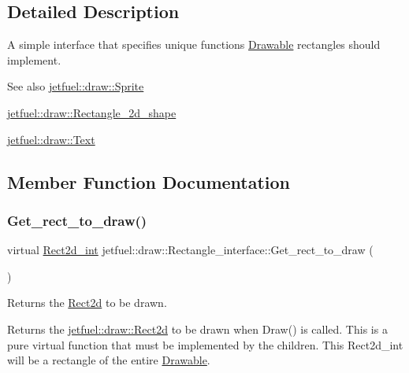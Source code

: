 \subsection{Detailed Description}
A simple interface that specifies unique functions \hyperlink{classjetfuel_1_1draw_1_1Drawable}{Drawable} rectangles should implement.

\begin{DoxySeeAlso}{See also}
\hyperlink{classjetfuel_1_1draw_1_1Sprite}{jetfuel\+::draw\+::\+Sprite} 

\hyperlink{classjetfuel_1_1draw_1_1Rectangle__2d__shape}{jetfuel\+::draw\+::\+Rectangle\+\_\+2d\+\_\+shape} 

\hyperlink{classjetfuel_1_1draw_1_1Text}{jetfuel\+::draw\+::\+Text} 
\end{DoxySeeAlso}


\subsection{Member Function Documentation}
\mbox{\label{classjetfuel_1_1draw_1_1Rectangle__interface_a03fd3b6842ab7b3065379caec407296f}} 
\subsubsection{\texorpdfstring{Get\+\_\+rect\+\_\+to\+\_\+draw()}{Get\_rect\_to\_draw()}}
{\footnotesize\ttfamily virtual \hyperlink{classjetfuel_1_1draw_1_1Rect2d}{Rect2d\+\_\+int} jetfuel\+::draw\+::\+Rectangle\+\_\+interface\+::\+Get\+\_\+rect\+\_\+to\+\_\+draw (\begin{DoxyParamCaption}{ }\end{DoxyParamCaption})\hspace{0.3cm}{\ttfamily [pure virtual]}}



Returns the \hyperlink{classjetfuel_1_1draw_1_1Rect2d}{Rect2d} to be drawn. 

Returns the \hyperlink{classjetfuel_1_1draw_1_1Rect2d}{jetfuel\+::draw\+::\+Rect2d} to be drawn when Draw() is called. This is a pure virtual function that must be implemented by the children. This Rect2d\+\_\+int will be a rectangle of the entire \hyperlink{classjetfuel_1_1draw_1_1Drawable}{Drawable}. 

